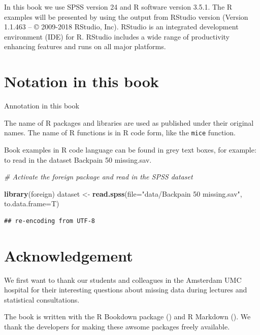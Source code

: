 \documentclass[]{book}
\newenvironment{Shaded}{\begin{snugshade}}{\end{snugshade}}
\newcommand{\KeywordTok}[1]{\textcolor[rgb]{0.13,0.29,0.53}{\textbf{#1}}}
\newcommand{\DataTypeTok}[1]{\textcolor[rgb]{0.13,0.29,0.53}{#1}}
\newcommand{\StringTok}[1]{\textcolor[rgb]{0.31,0.60,0.02}{#1}}
\newcommand{\CommentTok}[1]{\textcolor[rgb]{0.56,0.35,0.01}{\textit{#1}}}
\newcommand{\NormalTok}[1]{#1}
\begin{document}
In this book we use SPSS version 24 and R software version 3.5.1. The R
examples will be presented by using the output from RStudio version
(Version 1.1.463 -- © 2009-2018 RStudio, Inc). RStudio is an integrated
development environment (IDE) for R. RStudio includes a wide range of
productivity enhancing features and runs on all major platforms.

\section*{Notation in this book}\label{notation-in-this-book}

Annotation in this book

The name of R packages and libraries are used as published under their
original names. The name of R functions is in R code form, like the
\texttt{mice} function.

Book examples in R code language can be found in grey text boxes, for
example: to read in the dataset Backpain 50 missing.sav.

\begin{Shaded}
\begin{Highlighting}[]
\CommentTok{# Activate the foreign package and read in the SPSS dataset}

\KeywordTok{library}\NormalTok{(foreign)}
\NormalTok{dataset <-}\StringTok{ }\KeywordTok{read.spss}\NormalTok{(}\DataTypeTok{file=}\StringTok{"data/Backpain 50 missing.sav"}\NormalTok{, }\DataTypeTok{to.data.frame=}\NormalTok{T)}
\end{Highlighting}
\end{Shaded}

\begin{verbatim}
## re-encoding from UTF-8
\end{verbatim}

\section*{Acknowledgement}\label{acknowledgement}

We first want to thank our students and colleagues in the Amsterdam UMC
hospital for their interesting questions about missing data during
lectures and statistical consultations.

The book is written with the R Bookdown package (\citet{R-bookdown}) and
R Markdown (\citet{R-rmarkdown}). We thank the developers for making
these awsome packages freely available.
\end{document}
